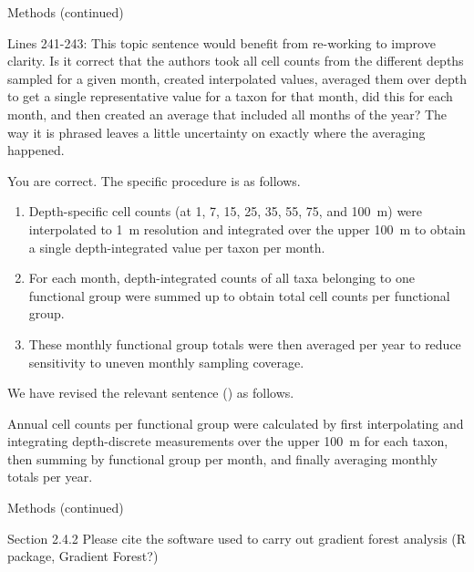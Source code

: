 \documentclass[12pt,english]{reviewresponse}
\begin{document}
\begin{revcomment}
	Methods (continued)

    Lines 241-243: This topic sentence would benefit from re-working to improve clarity. Is it correct that the authors took all cell counts from the different depths sampled for a given month, created interpolated values, averaged them over depth to get a single representative value for a taxon for that month, did this for each month, and then created an average that included all months of the year? The way it is phrased leaves a little uncertainty on exactly where the averaging happened.
\end{revcomment}
\begin{revresponse}
     You are correct. The specific procedure is as follows.
    \begin{enumerate}
        \item Depth-specific cell counts (at 1, 7, 15, 25, 35, 55, 75, and 100~m) were interpolated to 1~m resolution and integrated over the upper 100~m to obtain a single depth-integrated value per taxon per month.
        \item For each month, depth-integrated counts of all taxa belonging to one functional group were summed up to obtain total cell counts per functional group.
        \item These monthly functional group totals were then averaged per year to reduce sensitivity to uneven monthly sampling coverage.
    \end{enumerate}
    We have revised the relevant sentence () as follows.
    \begin{changes}
        Annual cell counts per functional group were calculated by first interpolating and integrating depth-discrete measurements over the upper 100~m for each taxon, then summing by functional group per month, and finally averaging monthly totals per year.
    \end{changes}
\end{revresponse}


\begin{revcomment}
	Methods (continued)

    Section 2.4.2
    Please cite the software used to carry out gradient forest analysis (R package, Gradient Forest?)
\end{revcomment}
\begin{revresponse}
\end{revresponse}
\end{document}
